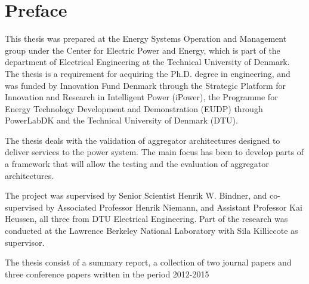\chapter{Preface}
This thesis was prepared at the Energy Systems Operation and Management group under the Center for Electric Power and Energy, which is part of the department of Electrical Engineering at the Technical University of Denmark. The thesis is a requirement for acquiring the Ph.D. degree in engineering, and was funded by Innovation Fund Denmark through the Strategic Platform for Innovation and Research in Intelligent Power (iPower), the Programme for Energy Technology Development and Demonstration (EUDP) through PowerLabDK and the Technical University of Denmark (DTU).

The thesis deals with the validation of aggregator architectures designed to deliver services to the power system. The main focus has been to develop parts of a framework that will allow the testing and the evaluation of aggregator architectures.

The project was supervised by Senior Scientist Henrik W. Bindner, and co-supervised by Associated Professor Henrik Niemann, and Assistant Professor Kai Heussen, all three from DTU Electrical Engineering. Part of the research was conducted at the Lawrence Berkeley National Laboratory with Sila Killiccote as supervisor.

The thesis consist of a summary report, a collection of two journal papers and three conference papers written in the period 2012-2015
\vfill

{
\centering
\begin{flushright}
    \thesisauthor{}
\end{flushright}
}
